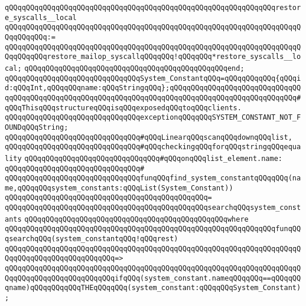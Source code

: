 \newline
\verb|qQQqqQQqqQQqqQQqqQQqqQQqqQQqqQQqqQQqqQQqqQQqqQQqqQQqqQQqqQQqqQQqrestore_syscalls__local|\newline
\verb|qQQqqQQqqQQqqQQqqQQqqQQqqQQqqQQqqQQqqQQqqQQqqQQqqQQqqQQqqQQqqQQqqQQqqQQqqQQqqQQq:=|\newline
\verb|qQQqqQQqqQQqqQQqqQQqqQQqqQQqqQQqqQQqqQQqqQQqqQQqqQQqqQQqqQQqqQQqqQQqqQQqqQQqqQQqrestore_mailop_syscallqQQqqQQq!qQQqqQQq*restore_syscalls__local;|\newline
\verb|qQQqqQQqqQQqqQQqqQQqqQQqqQQqqQQqqQQqqQQqqQQqqQQqend;|\newline
\newline
\verb|qQQqqQQqqQQqqQQqqQQqqQQqqQQqqQQqSystem_ConstantqQQq=qQQqqQQqqQQq{qQQqid:qQQqInt,qQQqqQQqname:qQQqStringqQQq};qQQqqQQqqQQqqQQqqQQqqQQqqQQqqQQqqQQqqQQqqQQqqQQqqQQqqQQqqQQqqQQqqQQqqQQqqQQqqQQqqQQqqQQqqQQqqQQqqQQq#qQQqThisqQQqstructureqQQqisqQQqexposedqQQqtoqQQqclients.|\newline
\newline
\verb|qQQqqQQqqQQqqQQqqQQqqQQqqQQqqQQqexceptionqQQqqQQqSYSTEM_CONSTANT_NOT_FOUNDqQQqString;|\newline
\newline
\verb|qQQqqQQqqQQqqQQqqQQqqQQqqQQqqQQq#qQQqLinearqQQqscanqQQqdownqQQqlist,|\newline
\verb|qQQqqQQqqQQqqQQqqQQqqQQqqQQqqQQq#qQQqcheckingqQQqforqQQqstringqQQqequality|\newline
\verb|qQQqqQQqqQQqqQQqqQQqqQQqqQQqqQQq#qQQqonqQQqlist_element.name:|\newline
\verb|qQQqqQQqqQQqqQQqqQQqqQQqqQQqqQQq#|\newline
\verb|qQQqqQQqqQQqqQQqqQQqqQQqqQQqqQQqfunqQQqfind_system_constantqQQqqQQq(name,qQQqqQQqsystem_constants:qQQqList(System_Constant))|\newline
\verb|qQQqqQQqqQQqqQQqqQQqqQQqqQQqqQQqqQQqqQQqqQQqqQQq=|\newline
\verb|qQQqqQQqqQQqqQQqqQQqqQQqqQQqqQQqqQQqqQQqqQQqqQQqsearchqQQqsystem_constants|\newline
\verb|qQQqqQQqqQQqqQQqqQQqqQQqqQQqqQQqqQQqqQQqqQQqqQQqwhere|\newline
\verb|qQQqqQQqqQQqqQQqqQQqqQQqqQQqqQQqqQQqqQQqqQQqqQQqqQQqqQQqqQQqqQQqfunqQQqsearchqQQq(system_constantqQQq!qQQqrest)|\newline
\verb|qQQqqQQqqQQqqQQqqQQqqQQqqQQqqQQqqQQqqQQqqQQqqQQqqQQqqQQqqQQqqQQqqQQqqQQqqQQqqQQqqQQqqQQqqQQqqQQq=>|\newline
\verb|qQQqqQQqqQQqqQQqqQQqqQQqqQQqqQQqqQQqqQQqqQQqqQQqqQQqqQQqqQQqqQQqqQQqqQQqqQQqqQQqqQQqqQQqqQQqqQQqifqQQq(system_constant.nameqQQqqQQq==qQQqqQQqname)qQQqqQQqqQQqTHEqQQqqQQq(system_constant:qQQqqQQqSystem_Constant);|\newline
